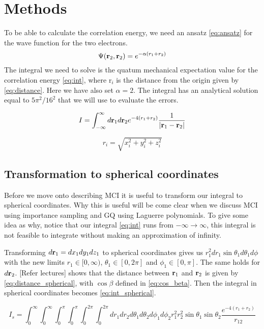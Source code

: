 \section{Methods}
To be able to calculate the correlation energy, we need an ansatz \cref{eq:ansatz} for the
wave function for the two electrons.
\begin{equation}\label{eq:ansatz}
  \Psi(\mathbf{r}_2, \mathbf{r}_2) = e^{-\alpha(r_1 + r_2)}
\end{equation}
The integral we need to solve is the quatum
mechanical expectation value for the correlation energy \cref{eq:int}, where r$_i$ is the distance from the
origin given by \cref{eq:distance}. Here we have also set $\alpha = 2$. The integral has an analytical solution
equal to $5\pi^2/16^2$ that we will use to evaluate the errors.

\begin{equation}
  \label{eq:int}
  I = \int_{-\infty}^{\infty} d\mathbf{r}_1 d\mathbf{r}_2 e^{-4(r_1+r_2)}
  \frac{1}{\abs{\mathbf{r}_1 - \mathbf{r}_2}}
\end{equation}

\begin{equation}
  \label{eq:distance}
r_i = \sqrt{x_i^2 + y_i^2 + z_i^2}
\end{equation}

\subsection{Transformation to spherical coordinates}
Before we move onto describing MCI it is useful to transform our integral to
spherical coordinates. Why this is useful will be come clear when we discuss
MCI using importance sampling and GQ using Laguerre polynomials. To give some idea
as why, notice that our integral \cref{eq:int} runs from $-\infty \to \infty$,
this integral is not feasible to integrate without making an approximation of infinity.

Transforming $d\mathbf{r}_1 = dx_1dy_1dz_1$ to spherical coordinates gives us
$r_1^2 dr_1 \sin{\theta_1}d\theta_1 d\phi$ with the new limits $r_1 \in [0, \infty)$,
 $\theta_1 \in [0, 2\pi]$ and $\phi_1 \in [0,\pi]$. The same holds for $d\mathbf{r}_2$.
[Refer lectures] shows that the distance between $\mathbf{r}_1$ and $\mathbf{r}_2$ is given by
\cref{eq:distance_spherical}, with $\cos{\beta}$ defined in \cref{eq:cos_beta}.
Then the integral in spherical coordinates becomes \cref{eq:int_spherical}.

\begin{equation}
  \label{eq:int_spherical}
  I_s = \int_{0}^{\infty} \int_{0}^{\infty} \int_{0}^{\pi} \int_{0}^{\pi}
  \int_{0}^{2\pi} \int_{0}^{2\pi}
  dr_1 dr_2 d\theta_1 d\theta_2 d\phi_1 d\phi_2
  r_1^2 r_2^2 \sin{\theta_1} \sin{\theta_2} \frac{e^{-4(r_1 + r_2)}}{r_{12}}
\end{equation}

